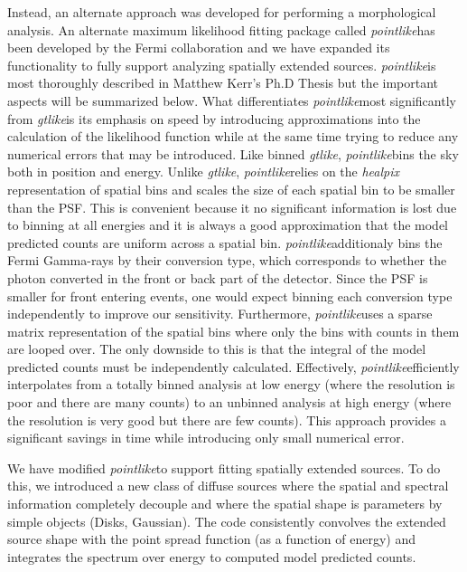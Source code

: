 \documentclass[preprint]{aastex}
\newcommand{\pointlike}{{\em pointlike}}
\newcommand{\gtlike}{{\em gtlike}}
\begin{document}
Instead, an alternate approach was developed for performing
a morphological analysis. An alternate maximum likelihood fitting
package called \pointlike has been developed by the Fermi
collaboration and we have expanded its functionality to fully support
analyzing spatially extended sources. \pointlike is most thoroughly
described in Matthew Kerr's Ph.D Thesis\cite{Matthew_kerr_phd_thesis}
but the important aspects will be summarized below. What differentiates
\pointlike most significantly from \gtlike is its emphasis
on speed by introducing approximations into the calculation of the
likelihood function while at the same time trying to reduce any
numerical errors that may be introduced.  Like binned \gtlike,
\pointlike bins the sky both in position and energy.  Unlike 
\gtlike, \pointlike relies on the {\em healpix} representation of spatial
bins\cite{healpix_paper} and scales the size of each spatial bin to be
smaller than the PSF. This is convenient because it no
significant information is lost due to binning at all energies and it is
always a good approximation that the model predicted counts are uniform
across a spatial bin. 
\pointlike additionaly bins the Fermi Gamma-rays by their conversion type,
which corresponds to whether the photon converted in the front or back
part of the detector. Since the PSF is smaller for front entering events,
one would expect binning each conversion type independently to improve
our sensitivity.
Furthermore, \pointlike uses a sparse matrix
representation of the spatial bins where only the bins with counts in them
are looped over. The only downside to this is that the integral of the
model predicted counts must be independently calculated.  Effectively,
\pointlike efficiently interpolates from a totally binned analysis
at low energy (where the resolution is poor and there are many counts)
to an unbinned analysis at high energy (where the resolution is very
good but there are few counts). This approach provides a significant
savings in time while introducing only small numerical error.

We have modified \pointlike to support fitting spatially extended
sources.  To do this, we introduced a new class of diffuse sources where
the spatial and spectral information completely decouple and where
the spatial shape is parameters by simple objects (Disks, Gaussian).
The code consistently convolves the extended source shape with the point
spread function (as a function of energy) and integrates the spectrum over energy
to computed model predicted counts.
\end{document}
